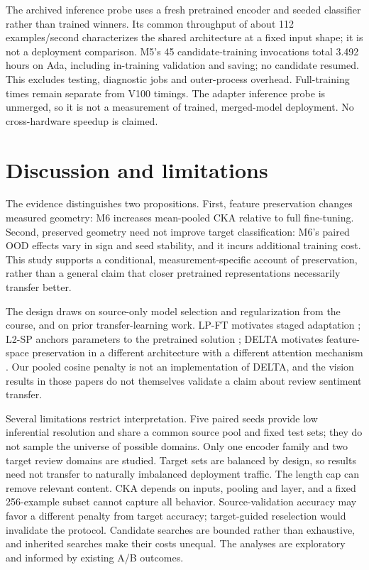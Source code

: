 \documentclass[a4paper,10pt]{article}
\begin{document}
The archived inference probe uses a fresh pretrained encoder and seeded classifier rather than trained winners. Its common throughput of about 112 examples/second characterizes the shared architecture at a fixed input shape; it is not a deployment comparison. M5's 45 candidate-training invocations total 3.492 hours on Ada, including in-training validation and saving; no candidate resumed. This excludes testing, diagnostic jobs and outer-process overhead. Full-training times remain separate from V100 timings. The adapter inference probe is unmerged, so it is not a measurement of trained, merged-model deployment. No cross-hardware speedup is claimed.

\clearpage
\section{Discussion and limitations}
The evidence distinguishes two propositions. First, feature preservation changes measured geometry: M6 increases mean-pooled CKA relative to full fine-tuning. Second, preserved geometry need not improve target classification: M6's paired OOD effects vary in sign and seed stability, and it incurs additional training cost. This study supports a conditional, measurement-specific account of preservation, rather than a general claim that closer pretrained representations necessarily transfer better.

The design draws on source-only model selection and regularization from the course, and on prior transfer-learning work. LP-FT motivates staged adaptation \cite{lpft}; L2-SP anchors parameters to the pretrained solution \cite{l2sp}; DELTA motivates feature-space preservation in a different architecture with a different attention mechanism \cite{delta}. Our pooled cosine penalty is not an implementation of DELTA, and the vision results in those papers do not themselves validate a claim about review sentiment transfer.

Several limitations restrict interpretation. Five paired seeds provide low inferential resolution and share a common source pool and fixed test sets; they do not sample the universe of possible domains. Only one encoder family and two target review domains are studied. Target sets are balanced by design, so results need not transfer to naturally imbalanced deployment traffic. The length cap can remove relevant content. CKA depends on inputs, pooling and layer, and a fixed 256-example subset cannot capture all behavior. Source-validation accuracy may favor a different penalty from target accuracy; target-guided reselection would invalidate the protocol. Candidate searches are bounded rather than exhaustive, and inherited searches make their costs unequal. The analyses are exploratory and informed by existing A/B outcomes.
\end{document}

